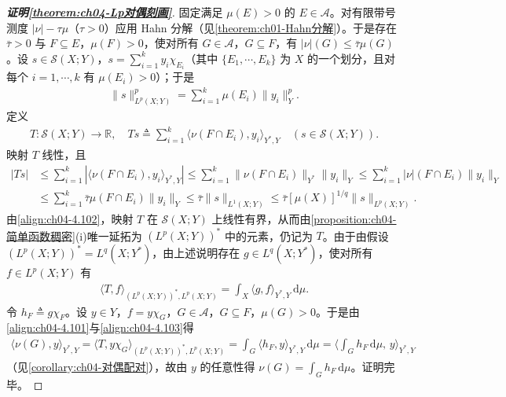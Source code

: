 \documentclass[../../main.tex]{subfiles}%
\begin{document}
\begin{proof}[\textbf{证明\cref{theorem:ch04-Lp对偶刻画}}]
固定满足 $\mu(E)>0$ 的 $E\in\mathcal{A}$。对有限带号测度 $|\nu|-\tau\mu$（$\tau>0$）应用 Hahn 分解（见\cref{theorem:ch01-Hahn分解}）。于是存在 $\bar\tau>0$ 与 $F\subseteq E$，$\mu(F)>0$，使对所有 $G\in\mathcal{A}$，$G\subseteq F$，有 $|\nu|(G)\leqslant\bar\tau\mu(G)$。设 $s\in\mathcal{S}(X;Y)$，$s=\sum_{i=1}^ky_i\chi_{E_i}$（其中 $\{E_1,\cdots,E_k\}$ 为 $X$ 的一个划分，且对每个 $i=1,\cdots,k$ 有 $\mu(E_i)>0$）；于是
\begin{align*}
\|s\|_{L^p(X;Y)}^p=\sum_{i=1}^k\mu(E_i)\|y_i\|_Y^p.
\end{align*}
定义
\begin{align}
T:\mathcal{S}(X;Y)\to\mathbb{R},\quad Ts\triangleq\sum_{i=1}^k\langle\nu(F\cap E_i),y_i\rangle_{Y^*,Y}\quad(s\in\mathcal{S}(X;Y)). \label{align:ch04-4.101}
\end{align}
映射 $T$ 线性，且
\begin{align}
|Ts|&\leqslant\sum_{i=1}^k|\langle\nu(F\cap E_i),y_i\rangle_{Y^*,Y}|
\leqslant\sum_{i=1}^k\|\nu(F\cap E_i)\|_{Y^*}\|y_i\|_Y
\leqslant\sum_{i=1}^k|\nu|(F\cap E_i)\|y_i\|_Y\nonumber\\
&\leqslant\sum_{i=1}^k\bar\tau\mu(F\cap E_i)\|y_i\|_Y\leqslant\bar\tau\|s\|_{L^1(X;Y)}\leqslant\bar\tau[\mu(X)]^{1/q}\|s\|_{L^p(X;Y)}. \label{align:ch04-4.102}
\end{align}
由\eqref{align:ch04-4.102}，映射 $T$ 在 $\mathcal{S}(X;Y)$ 上线性有界，从而由\cref{proposition:ch04-简单函数稠密}(i)唯一延拓为 $(L^p(X;Y))^*$ 中的元素，仍记为 $T$。由于由假设 $(L^p(X;Y))^*=L^q(X;Y^*)$，由上述说明存在 $g\in L^q(X;Y^*)$，使对所有 $f\in L^p(X;Y)$ 有
\begin{align}
\langle T,f\rangle_{(L^p(X;Y))^*,L^p(X;Y)}=\int_X\langle g,f\rangle_{Y^*,Y}\,\mathrm{d}\mu. \label{align:ch04-4.103}
\end{align}
令 $h_F\triangleq g\chi_F$。设 $y\in Y$，$f=y\chi_G$，$G\in\mathcal{A}$，$G\subseteq F$，$\mu(G)>0$。于是由\eqref{align:ch04-4.101}与\eqref{align:ch04-4.103}得
\begin{align*}
\langle\nu(G),y\rangle_{Y^*,Y}=\langle T,y\chi_G\rangle_{(L^p(X;Y))^*,L^p(X;Y)}
=\int_G\langle h_F,y\rangle_{Y^*,Y}\,\mathrm{d}\mu
=\Big\langle\int_Gh_F\,\mathrm{d}\mu,\,y\Big\rangle_{Y^*,Y}
\end{align*}
（见\cref{corollary:ch04-对偶配对}），故由 $y$ 的任意性得 $\nu(G)=\int_Gh_F\,\mathrm{d}\mu$。证明完毕。
\end{proof}
\end{document}
